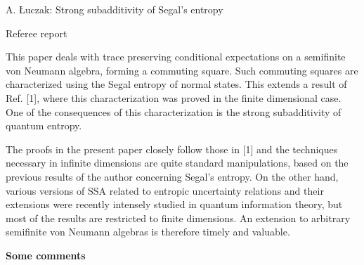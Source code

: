 \documentclass[12pt]{article}
\begin{document}
\begin{center}
{\large A. {\L}uczak: Strong subadditivity of Segal’s entropy}

\end{center}
\medskip

\centerline{Referee report}

\bigskip

This paper deals with trace preserving conditional expectations on a semifinite von
Neumann algebra, forming a commuting square. Such commuting squares are characterized
using the Segal entropy of normal states. This extends a result of Ref. [1], where this
characterization was proved in the finite dimensional case. One of the consequences of
this characterization is the strong subadditivity of quantum entropy.

The proofs in the present paper closely follow those in [1] and the techniques necessary
in infinite dimensions are quite standard manipulations, based on the previous
results of the author concerning Segal's entropy.  On the other hand, various versions of 
SSA related to entropic uncertainty relations and their extensions were recently intensely studied in quantum
information theory, but most of the results are restricted to finite dimensions. An extension to arbitrary semifinite
von Neumann algebras is therefore timely and valuable.


\medskip


\noindent
\textbf{Some comments}
\end{document}
